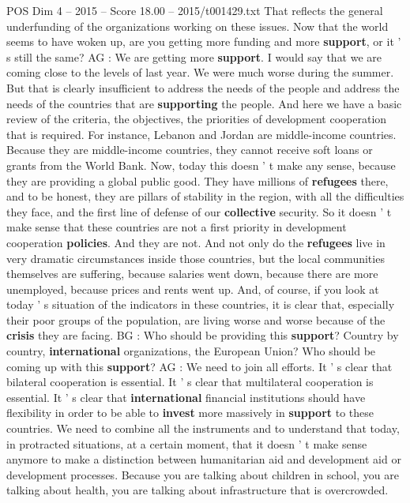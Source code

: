 \begin{textsample}{POS Dim 4 – 2015 – Score 18.00 – 2015/t001429.txt}
That reflects the general underfunding of the organizations working on these issues.
Now that the world seems to have woken up, are you getting more funding and more \textbf{support}, or it ' s still the same?
AG : We are getting more \textbf{support}.
I would say that we are coming close to the levels of last year.
We were much worse during the summer.
But that is clearly insufficient to address the needs of the people and address the needs of the countries that are \textbf{supporting} the people.
And here we have a basic review of the criteria, the objectives, the priorities of development cooperation that is required.
For instance, Lebanon and Jordan are middle-income countries.
Because they are middle-income countries, they cannot receive soft loans or grants from the World Bank.
Now, today this doesn ' t make any sense, because they are providing a global public good.
They have millions of \textbf{refugees} there, and to be honest, they are pillars of stability in the region, with all the difficulties they face, and the first line of defense of our \textbf{collective} security.
So it doesn ' t make sense that these countries are not a first priority in development cooperation \textbf{policies}.
And they are not.
And not only do the \textbf{refugees} live in very dramatic circumstances inside those countries, but the local communities themselves are suffering, because salaries went down, because there are more unemployed, because prices and rents went up.
And, of course, if you look at today ' s situation of the indicators in these countries, it is clear that, especially their poor groups of the population, are living worse and worse because of the \textbf{crisis} they are facing.
BG : Who should be providing this \textbf{support}?
Country by country, \textbf{international} organizations, the European Union?
Who should be coming up with this \textbf{support}?
AG : We need to join all efforts.
It ' s clear that bilateral cooperation is essential.
It ' s clear that multilateral cooperation is essential.
It ' s clear that \textbf{international} financial institutions should have flexibility in order to be able to \textbf{invest} more massively in \textbf{support} to these countries.
We need to combine all the instruments and to understand that today, in protracted situations, at a certain moment, that it doesn ' t make sense anymore to make a distinction between humanitarian aid and development aid or development processes.
Because you are talking about children in school, you are talking about health, you are talking about infrastructure that is overcrowded.

\end{textsample}

